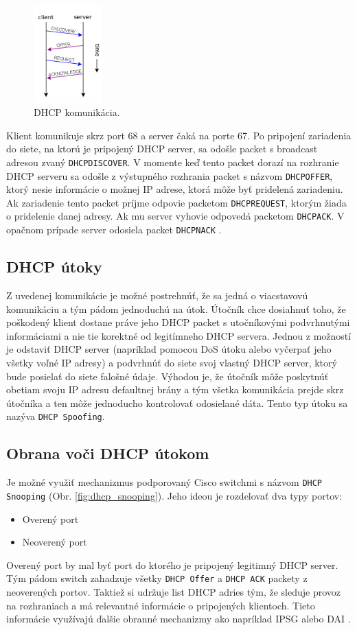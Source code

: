 \documentclass{article}
\begin{document}
\begin{figure}[h]
    \centering
    \includegraphics[width=100px]{pic/DHCP_session.png}
    \caption{DHCP komunikácia. }
    \label{fig:dhcp_session}
\end{figure}

Klient komunikuje skrz port 68 a server čaká na porte 67. Po pripojení zariadenia do siete, na ktorú je pripojený DHCP server, sa odošle packet s broadcast adresou zvaný \texttt{DHCPDISCOVER}. V momente keď tento packet dorazí na rozhranie DHCP serveru sa odošle z výstupného rozhrania packet s názvom \texttt{DHCPOFFER}, ktorý nesie informácie o možnej IP adrese, ktorá môže byť pridelená zariadeniu. Ak zariadenie tento packet príjme odpovie packetom \texttt{DHCPREQUEST}, ktorým žiada o pridelenie danej adresy. Ak mu server vyhovie odpovedá packetom \texttt{DHCPACK}. V opačnom prípade server odosiela packet \texttt{DHCPNACK} \cite{dhcp}.

\subsection{DHCP útoky}
Z uvedenej komunikácie je možné postrehnúť, že sa jedná o viacstavovú komunikáciu a tým pádom jednoduchú na útok. Útočník chce dosiahnuť toho, že poškodený klient dostane práve jeho DHCP packet s utočníkovými podvrhnutými informáciami a nie tie korektné od legitímneho DHCP servera. Jednou z možností je odstaviť DHCP server (napríklad pomocou DoS útoku alebo vyčerpať jeho všetky voľné IP adresy) a podvrhnúť do siete svoj vlastný DHCP server, ktorý bude posielať do siete falošné údaje. Výhodou je, že útočník môže poskytnúť obetiam svoju IP adresu defaultnej brány a tým všetka komunikácia prejde skrz útočníka a ten môže jednoducho kontrolovať odosielané dáta. Tento typ útoku sa nazýva \texttt{DHCP Spoofing}.

\subsection{Obrana voči DHCP útokom}
Je možné využiť mechanizmus podporovaný Cisco switchmi s názvom \texttt{DHCP Snooping} (Obr. \ref{fig:dhcp_snooping}). Jeho ideou je rozdelovať dva typy portov:
\begin{itemize}
    \item Overený port
    \item Neoverený port
\end{itemize}
Overený port by mal byť port do ktorého je pripojený legitimný DHCP server. Tým pádom switch zahadzuje všetky \texttt{DHCP Offer} a \texttt{DHCP ACK} packety z neoverených portov. Taktiež si udržuje list DHCP adries tým, že sleduje provoz na rozhraniach a má relevantné informácie o pripojených klientoch. Tieto informácie využívajú ďalšie obranné mechanizmy ako napríklad IPSG alebo DAI \cite{dhcp_spoofing}.
\end{document}
